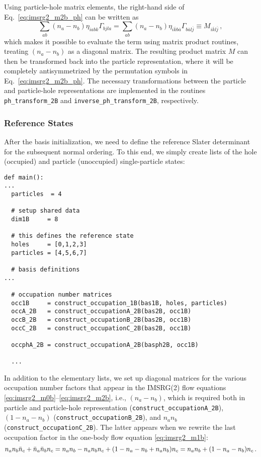 Using particle-hole matrix elements, the right-hand side of Eq.~\eqref{eq:imsrg2_m2b_ph} 
can be written as
\begin{equation}
  \sum_{ab}(n_a-n_b)\eta_{iabk}\Gamma_{bjla}
  = \sum_{ab}(n_a-n_b) \eta_{i\overline{k}b\overline{a}}\Gamma_{b\overline{a}l\overline{j}}
  \equiv M_{i\overline{k}l\overline{j}}\,,
\end{equation}
which makes it possible to evaluate the term using matrix product routines,
treating $(n_a-n_b)$ as a diagonal matrix. The resulting product matrix $M$
can then be transformed back into the particle representation, where it will 
be completely antisymmetrized by the permutation symbols in Eq.~\eqref{eq:imsrg2_m2b_ph}. 
The necessary transformations between the particle and particle-hole 
representations are implemented in the routines \texttt{ph\_transform\_2B}
and \texttt{inverse\_ph\_transform\_2B}, respectively.

\subsubsection*{Reference States}
After the basis initialization, we need to define the reference Slater
determinant \ket{\Phi} for the subsequent normal ordering. To this end, 
we simply create lists of the hole (occupied) and particle (unoccupied)
single-particle states:
\begin{lstlisting}
def main():
...
  particles  = 4

  # setup shared data
  dim1B     = 8

  # this defines the reference state
  holes     = [0,1,2,3]
  particles = [4,5,6,7]

  # basis definitions
...

  # occupation number matrices
  occ1B     = construct_occupation_1B(bas1B, holes, particles)
  occA_2B   = construct_occupationA_2B(bas2B, occ1B)
  occB_2B   = construct_occupationB_2B(bas2B, occ1B)
  occC_2B   = construct_occupationC_2B(bas2B, occ1B)

  occphA_2B = construct_occupationA_2B(basph2B, occ1B)

  ...
\end{lstlisting}
In addition to the elementary lists, we set up diagonal matrices for
the various occupation number factors that appear in the IMSRG(2)
flow equations \eqref{eq:imsrg2_m0b}--\eqref{eq:imsrg2_m2b},
i.e., $(n_a - n_b)$, which is required both in particle and particle-hole
representation (\texttt{construct\_occupationA\_2B}), $(1-n_a-n_b)$
(\texttt{construct\_occupationB\_2B}), and $n_a n_b$ (\texttt{construct\_occupationC\_2B}).
The latter appears when we rewrite the last occupation factor in 
the one-body flow equation \eqref{eq:imsrg2_m1b}:
\begin{equation}
  n_a n_b \bar{n}_c + \bar{n}_a \bar{n}_b n_c = n_a n_b - n_a n_b n_c + (1 - n_a - n_b + n_a n_b) n_c
  = n_a n_b + (1-n_a - n_b)n_c\,.
\end{equation}

